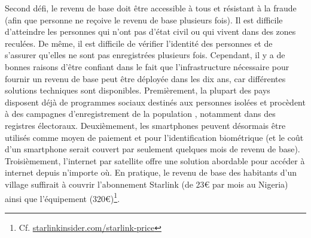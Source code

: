 \documentclass[a5paper,french]{memoir}
\begin{document}
Second défi, le revenu de base doit être accessible à tous et résistant à la fraude (afin que personne ne reçoive le revenu de base plusieurs fois). Il est difficile d'atteindre les personnes qui n'ont pas d'état civil ou qui vivent dans des zones reculées. De même, il est difficile de vérifier l'identité des personnes et de s'assurer qu'elles ne sont pas enregistrées plusieurs fois. Cependant, il y a de bonnes raisons d'être confiant dans le fait que l'infrastructure nécessaire pour fournir un revenu de base peut être déployée dans les dix ans, car différentes solutions techniques sont disponibles. Premièrement, la plupart des pays disposent déjà de programmes sociaux destinés aux personnes isolées et procèdent à des campagnes d'enregistrement de la population%
, notamment dans des registres électoraux. %
Deuxièmement, les smartphones peuvent désormais être utilisés comme moyen de paiement et pour l'identification biométrique (et le coût d'un smartphone serait couvert par seulement quelques mois de revenu de base). %
Troisièmement, %
l'internet par satellite offre une solution abordable pour accéder à internet depuis n'importe où. En pratique, le revenu de base des habitants d'un village suffirait à couvrir l'abonnement Starlink (de 23\euro{} par mois au Nigeria) ainsi que l'équipement (320\euro{})\footnote{Cf. \href{https://starlinkinsider.com/starlink-price/}{starlinkinsider.com/starlink-price}}. %
\end{document}
